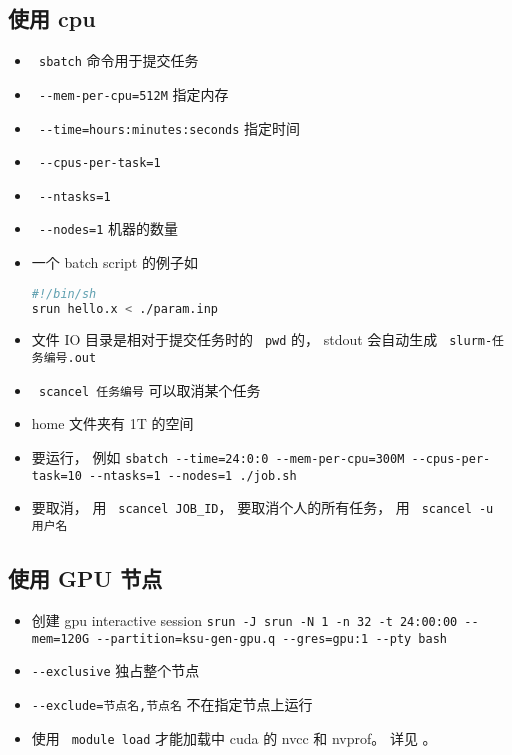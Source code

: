 
\begin{issues}
\issueDraft
\end{issues}

\subsection{使用 cpu}
\begin{itemize}
\item \verb` sbatch` 命令用于提交任务
\item \verb` --mem-per-cpu=512M` 指定内存
\item \verb` --time=hours:minutes:seconds` 指定时间
\item \verb` --cpus-per-task=1`
\item \verb` --ntasks=1`
\item \verb` --nodes=1` 机器的数量
\item 一个 batch script 的例子如
\begin{lstlisting}[language=bash]
#!/bin/sh
srun hello.x < ./param.inp
\end{lstlisting}
\item 文件 IO 目录是相对于提交任务时的 \verb` pwd` 的， stdout 会自动生成 \verb` slurm-任务编号.out`
\item \verb` scancel 任务编号` 可以取消某个任务
\item home 文件夹有 1T 的空间
\item 要运行， 例如
\verb`sbatch --time=24:0:0 --mem-per-cpu=300M --cpus-per-task=10 --ntasks=1 --nodes=1 ./job.sh`
\item 要取消， 用 \verb` scancel JOB_ID`， 要取消个人的所有任务， 用 \verb` scancel -u 用户名`
\end{itemize}

\subsection{使用 GPU 节点}
\begin{itemize}
\item 创建 gpu interactive session \verb`srun -J srun -N 1 -n 32 -t 24:00:00 --mem=120G --partition=ksu-gen-gpu.q --gres=gpu:1 --pty bash`
\item \verb`--exclusive` 独占整个节点
\item \verb`--exclude=节点名,节点名` 不在指定节点上运行
\item 使用 \verb` module load` 才能加载中 cuda 的 nvcc 和 nvprof。 详见 。
\end{itemize}

